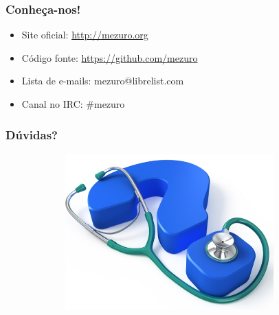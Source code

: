 \documentclass{beamer}
\begin{document}
\begin{frame}
  \frametitle{Conheça-nos!}

  \begin{itemize}
    \item Site oficial: \url{http://mezuro.org}
    \item Código fonte: \url{https://github.com/mezuro}
    \item Lista de e-mails: mezuro@librelist.com
    \item Canal no IRC: \#mezuro
  \end{itemize}
\end{frame}

\begin{frame}
  \frametitle{Dúvidas?}
  \begin{figure}
    \begin{flushleft}
    \begin{center}
    \includegraphics[width=10.5cm, height=6cm]{images/questions.jpg}
    \end{center}

      \label{fig:logo-mezuro}
    \end{flushleft}
  \end{figure}
\end{frame}
\end{document}
